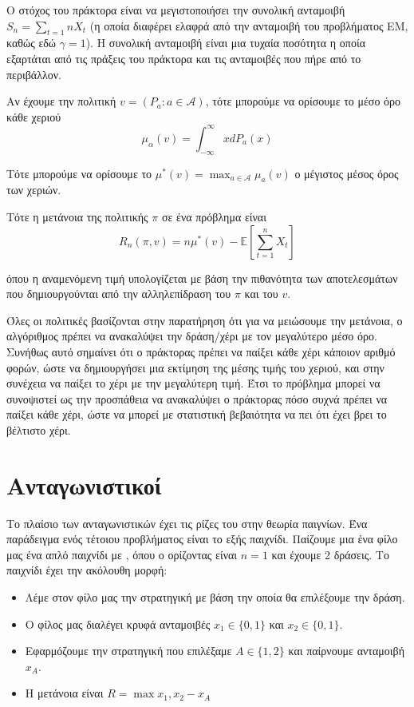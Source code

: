 Ο στόχος του πράκτορα είναι να μεγιστοποιήσει την συνολική ανταμοιβή $S_n = \sum_{t=1}{n}X_t$ (η οποία διαφέρει ελαφρά από την ανταμοιβή του προβλήματος ΕΜ, καθώς εδώ $γ=1$). Η συνολική ανταμοιβή είναι μια τυχαία ποσότητα η οποία εξαρτάται από τις πράξεις του πράκτορα και τις ανταμοιβές που πήρε από το περιβάλλον.

Αν έχουμε την πολιτική $v = (P_a : a \in \mathcal{A})$, τότε μπορούμε να ορίσουμε το μέσο όρο κάθε χεριού
\begin{equation*}
    μ_α(v) = \int_{-\infty}^{\infty}xdP_a(x)
\end{equation*}

Τότε μπορούμε να ορίσουμε το $μ^*(v) = \max_{a\in \mathcal{A}}μ_a(v)$ ο μέγιστος μέσος όρος των χεριών.

Τότε η μετάνοια της πολιτικής $π$ σε ένα πρόβλημα  είναι
\begin{equation}
    R_n(π,v) = nμ^*(v) - \mathbb{E}\left[ \sum_{t=1}^{n} X_t \right]
\end{equation}

όπου η αναμενόμενη τιμή υπολογίζεται με βάση την πιθανότητα των αποτελεσμάτων που δημιουργούνται από την αλληλεπίδραση του $π$ και του $v$.

Όλες οι πολιτικές βασίζονται στην παρατήρηση ότι για να μειώσουμε την μετάνοια, ο αλγόριθμος πρέπει να ανακαλύψει την δράση/χέρι με τον μεγαλύτερο μέσο όρο. Συνήθως αυτό σημαίνει ότι ο πράκτορας πρέπει να παίξει κάθε χέρι κάποιον αριθμό φορών, ώστε να δημιουργήσει μια εκτίμηση της μέσης τιμής του χεριού, και στην συνέχεια να παίξει το χέρι με την μεγαλύτερη τιμή. Έτσι το πρόβλημα μπορεί να συνοψιστεί ως την προσπάθεια να ανακαλύψει ο πράκτορας πόσο συχνά πρέπει να παίξει κάθε χέρι, ώστε να μπορεί με στατιστική βεβαιότητα να πει ότι έχει βρει το βέλτιστο χέρι.

\section{Ανταγωνιστικοί }

Το πλαίσιο των ανταγωνιστικών  έχει τις ρίζες του στην θεωρία παιγνίων. Ένα παράδειγμα ενός τέτοιου προβλήματος είναι το εξής παιχνίδι. Παίζουμε μια ένα φίλο μας ένα απλό παιχνίδι με , όπου ο ορίζοντας είναι $n=1$ και έχουμε 2 δράσεις. Το παιχνίδι έχει την ακόλουθη μορφή:
\begin{itemize}
    \item Λέμε στον φίλο μας την στρατηγική με βάση την οποία θα επιλέξουμε την δράση.
    \item Ο φίλος μας διαλέγει κρυφά ανταμοιβές $x_1 \in \{0,1\}$ και $x_2 \in \{0,1\}$.
    \item Εφαρμόζουμε την στρατηγική που επιλέξαμε $A \in \{1,2\}$ και παίρνουμε ανταμοιβή $x_A$.
    \item Η μετάνοια είναι $R = \max{x_1,x_2} - x_A$
\end{itemize}

